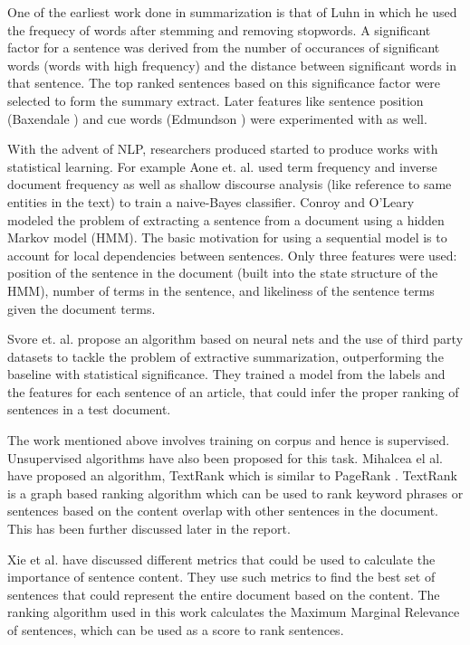 One of the earliest work done in summarization is that of Luhn \cite{luhn} in which he used the frequecy of words after stemming and removing stopwords.
A significant factor for a sentence was derived from the number of occurances of significant words (words with high frequency) and the distance between significant words in that sentence.
The top ranked sentences based on this significance factor were selected to form the summary extract.
Later features like sentence position (Baxendale \cite{Baxendale}) and cue words (Edmundson \cite{Edmundson:1969:NMA:321510.321519}) were experimented with as well.

With the advent of NLP, researchers produced started to produce works with statistical learning.
For example Aone et. al. \cite{Aone99} used term frequency and inverse document frequency as well as shallow discourse analysis (like reference to same entities in the text) to train a naive-Bayes classifier.
Conroy and O'Leary \cite{Conroy:2001:TSV:383952.384042} modeled the problem of extracting a sentence from a document using a hidden Markov model (HMM).
The basic motivation for using a sequential model is to account for local dependencies between sentences.
Only three features were used: position of the sentence in the document (built into the state structure of the HMM), number of terms in the sentence, and likeliness of the sentence terms given the document terms.

Svore et. al. \cite{Svore} propose an algorithm based on neural nets and the use of third party datasets to tackle the problem of extractive summarization, outperforming the baseline with statistical significance.
They trained a model from the labels and the features for each sentence of an article, that could infer the proper ranking of sentences in a test document.

The work mentioned above involves training on corpus and hence is supervised.
Unsupervised algorithms have also been proposed for this task.
Mihalcea el al. \cite{mihalcea-tarau:2004:EMNLP} have proposed an algorithm, TextRank which is similar to PageRank \cite{ilprints422}.
TextRank is a graph based ranking algorithm which can be used to rank keyword phrases or sentences based on the content overlap with other sentences in the document.
This has been further discussed later in the report.

Xie et al. \cite{4518777} have discussed different metrics that could be used to calculate the importance of sentence content.
They use such metrics to find the best set of sentences that could represent the entire document based on the content.
The ranking algorithm used in this work calculates the Maximum Marginal Relevance \cite{Carbonell:1998:UMD:290941.291025} of sentences, which can be used as a score to rank sentences.

